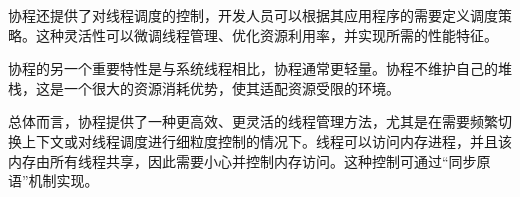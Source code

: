 协程还提供了对线程调度的控制，开发人员可以根据其应用程序的需要定义调度策略。这种灵活性可以微调线程管理、优化资源利用率，并实现所需的性能特征。

协程的另一个重要特性是与系统线程相比，协程通常更轻量。协程不维护自己的堆栈，这是一个很大的资源消耗优势，使其适配资源受限的环境。

总体而言，协程提供了一种更高效、更灵活的线程管理方法，尤其是在需要频繁切换上下文或对线程调度进行细粒度控制的情况下。线程可以访问内存进程，并且该内存由所有线程共享，因此需要小心并控制内存访问。这种控制可通过“同步原语”机制实现。


































